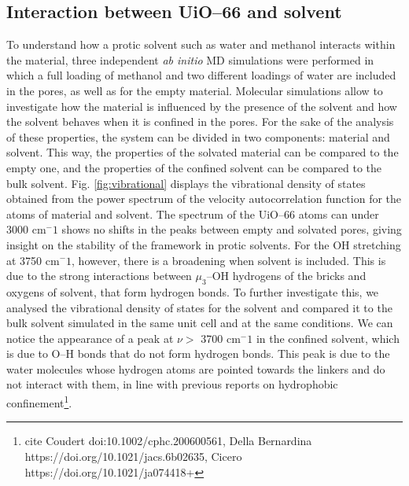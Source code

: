 \subsection{Interaction between UiO--66 and solvent}
To understand how a protic solvent such as water and methanol interacts within the material, three independent \textit{ab initio} MD simulations were performed in which a full loading of methanol and two different loadings of water are included in the pores, as well as for the empty material. Molecular simulations allow to investigate how the material is influenced by the presence of the solvent and how the solvent behaves when it is confined in the pores. For the sake of the analysis of these properties, the system can be divided in two components: material and solvent. This way, the properties of the solvated material can be compared to the empty one, and the properties of the confined solvent can be compared to the bulk solvent. Fig. \ref{fig:vibrational} displays the vibrational density of states obtained from the power spectrum of the velocity autocorrelation function for the atoms of material and solvent. The spectrum of the UiO--66 atoms can under 3000 cm$^-1$ shows no shifts in the peaks between empty and solvated pores, giving insight on the stability of the framework in protic solvents. For the OH stretching at 3750 cm$^-1$, however, there is a broadening when solvent is included. This is due to the strong interactions between $\mu_3$--OH hydrogens of the bricks and oxygens of solvent, that form hydrogen bonds. To further investigate this, we analysed the vibrational density of states for the solvent and compared it to the bulk solvent simulated in the same unit cell and at the same conditions. We can notice the appearance of a peak at $\nu >$ 3700 cm$^-1$ in the confined solvent, which is due to O--H bonds that do not form hydrogen bonds. This peak is due to the water molecules whose hydrogen atoms are pointed towards the linkers and do not interact with them, in line with previous reports on hydrophobic confinement\footnote{cite Coudert doi:10.1002/cphc.200600561, Della Bernardina https://doi.org/10.1021/jacs.6b02635, Cicero https://doi.org/10.1021/ja074418+}. 

